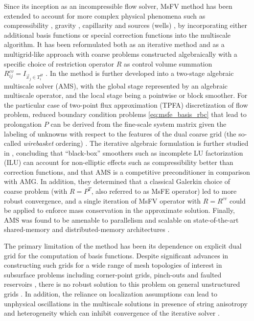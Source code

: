 Since its inception as an incompressible flow solver, MsFV method has been extended to account for more complex physical phenomena such as compressibility \cite{Lunati2006}, gravity \cite{Lunati2008,Lee2008}, capillarity \cite{Lee2008} and sources (wells) \cite{Wolfsteiner2006,Lee2008}, by incorporating either additional basis functions or special correction functions into the multiscale algorithm.   It has been reformulated both as an iterative method \cite{Nordbotten2008,Hajibeygi2008} and as a multigrid-like approach with coarse problems constructed algebraically with a specific choice of restriction operator $R$ as control volume summation $R_{ij}^{cv} = I_{\vec{x}_j \in T_i^H}$ \cite{Zhou2008}.   In \cite{Zhou2010,Zhou2012} the method is further developed into a two-stage algebraic multiscale solver (AMS), with the global stage represented by an algebraic multiscale operator, and the local stage being a pointwise or block smoother.   For the particular case of two-point flux approximation (TPFA) discretization of flow problem, reduced boundary condition problems \cref{eq:msfe_basis_rbc} that lead to prolongation $P$ can be derived from the fine-scale system matrix given the labeling of unknowns with respect to the features of the dual coarse grid (the so-called \textit{wirebasket} ordering) \cite{Zhou2010}.   The iterative algebraic formulation is further studied in \cite{Wang2014,Wang2015}, concluding that ``black-box'' smoothers such as incomplete LU factorization (ILU) can account for non-elliptic effects such as compressibility better than correction functions, and that AMS is a competitive preconditioner in comparison with AMG.   In addition, they determined that a classical Galerkin choice of coarse problem (with $R = P^T$, also referred to as MsFE operator) led to more robust convergence, and a single iteration of MsFV operator with $R = R^{cv}$ could be applied to enforce mass conservation in the approximate solution.   Finally, AMS was found to be amenable to parallelism and scalable on state-of-the-art shared-memory and distributed-memory architectures \cite{Manea2015,Manea2016,Manea2019}.

The primary limitation of the method has been its dependence on explicit dual grid for the computation of basis functions.   Despite significant advances in constructing such grids for a wide range of mesh topologies of interest in subsurface problems including corner-point grids, pinch-outs and faulted reservoirs \cite{Moyner2014a}, there is no robust solution to this problem on general unstructured grids \cite{Moyner2014}.   In addition, the reliance on localization assumptions can lead to unphysical oscillations in the multiscale solutions in presence of string anisotropy and heterogeneity which can inhibit convergence of the iterative solver \cite{Moyner2016}.


